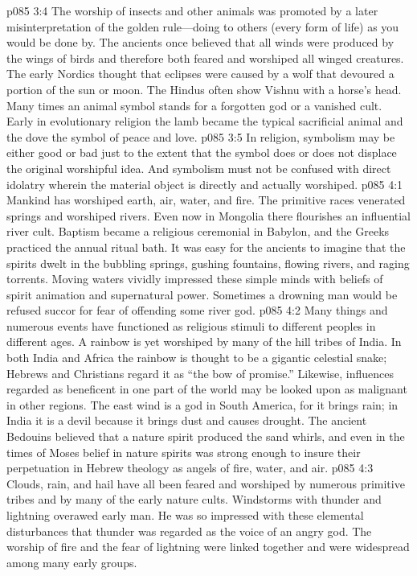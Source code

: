 \vs p085 3:4 The worship of insects and other animals was promoted by a later misinterpretation of the golden rule---doing to others (every form of life) as you would be done by. The ancients once believed that all winds were produced by the wings of birds and therefore both feared and worshiped all winged creatures. The early Nordics thought that eclipses were caused by a wolf that devoured a portion of the sun or moon. The Hindus often show Vishnu with a horse’s head. Many times an animal symbol stands for a forgotten god or a vanished cult. Early in evolutionary religion the lamb became the typical sacrificial animal and the dove the symbol of peace and love.\plusone
\vs p085 3:5 In religion, symbolism may be either good or bad just to the extent that the symbol does or does not displace the original worshipful idea. And symbolism must not be confused with direct idolatry wherein the material object is directly and actually worshiped.
\vs p085 4:1 Mankind has worshiped earth, air, water, and fire. The primitive races venerated springs and worshiped rivers. Even now in Mongolia there flourishes an influential river cult. Baptism became a religious ceremonial in Babylon, and the Greeks practiced the annual ritual bath. It was easy for the ancients to imagine that the spirits dwelt in the bubbling springs, gushing fountains, flowing rivers, and raging torrents. Moving waters vividly impressed these simple minds with beliefs of spirit animation and supernatural power. Sometimes a drowning man would be refused succor for fear of offending some river god.
\vs p085 4:2 Many things and numerous events have functioned as religious stimuli to different peoples in different ages. A rainbow is yet worshiped by many of the hill tribes of India. In both India and Africa the rainbow is thought to be a gigantic celestial snake; Hebrews and Christians regard it as “the bow of promise.” Likewise, influences regarded as beneficent in one part of the world may be looked upon as malignant in other regions. The east wind is a god in South America, for it brings rain; in India it is a devil because it brings dust and causes drought. The ancient Bedouins believed that a nature spirit produced the sand whirls, and even in the times of Moses belief in nature spirits was strong enough to insure their perpetuation in Hebrew theology as angels of fire, water, and air.
\vs p085 4:3 Clouds, rain, and hail have all been feared and worshiped by numerous primitive tribes and by many of the early nature cults. Windstorms with thunder and lightning overawed early man. He was so impressed with these elemental disturbances that thunder was regarded as the voice of an angry god. The worship of fire and the fear of lightning were linked together and were widespread among many early groups.
